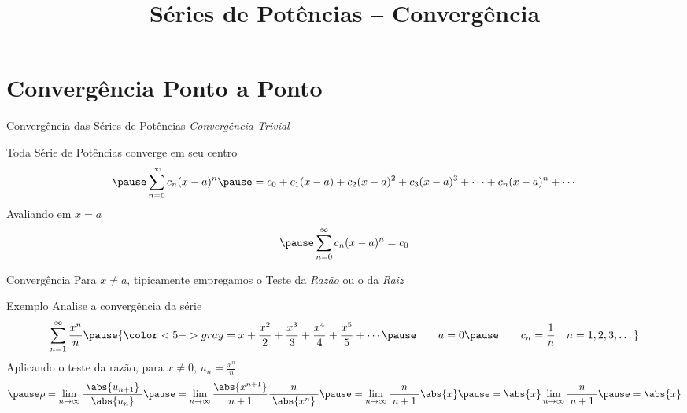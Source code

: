 \documentclass[fleqn,utf8,aspectratio=169,12pt]{beamer}
\title{Séries de Potências -- Convergência}
\begin{document}
\addtitle

\section{Convergência Ponto a Ponto}

\begin{frame}{Convergência das Séries de Potências}
  \emph{Convergência Trivial}

  \pause
  \vspace{\baselineskip}
  Toda Série de Potências converge em seu centro
  \[
    \pause
    \sum_{n=0}^\infty c_n(x-a)^n
    \pause
    = c_0
    + c_1(x-a)
    + c_2(x-a)^2
    + c_3(x-a)^3
    + \cdots
    + c_n(x-a)^n
    + \cdots
  \]
  \pause
  Avaliando em $x=a$
  \[
    \pause
    \sum_{n=0}^\infty c_n(x-a)^n
    = c_0
  \]
\end{frame}

\begin{frame}{Convergência}
  Para \emph{$x\neq a$},
  tipicamente empregamos o Teste da \emph{Razão} ou o da \emph{Raiz}
\end{frame}

\addtocounter{exemplo}{1}
\begin{frame}{Exemplo \theexemplo}
  Analise a convergência da série
  \[
    \sum_{n=1}^{\infty} \frac{x^n}{n}
    \pause
    {\color<5->{gray}
    = x + \frac{x^2}{2}
        + \frac{x^3}{3}
        + \frac{x^4}{4}
        + \frac{x^5}{5}
        + \cdots
    \pause
    \qquad
    a = 0
    \pause
    \qquad
    c_n = \frac{1}{n} \quad n = 1, 2, 3, \dots}
  \]
  \pause
  Aplicando o teste da razão, para $x\neq 0$,
  \pause
  \quad\(u_n = \frac{x^n}{n}\)
  \[
    \pause \rho = \lim_{n\to\infty} \frac{\;\abs{u_{n+1}}\;}{\abs{u_n}}
    \pause = \lim_{n\to\infty} \frac{\abs{x^{n+1}}}{\;n+1\;} \frac{n}{\;\abs{x^n}\;}
    \pause = \lim_{n\to\infty} \frac{n}{\;n+1\;} \abs{x}
    \pause = \abs{x} \lim_{n\to\infty} \frac{n}{\;n+1\;}
    \pause = \abs{x}
  \]
\end{frame}
\end{document}
